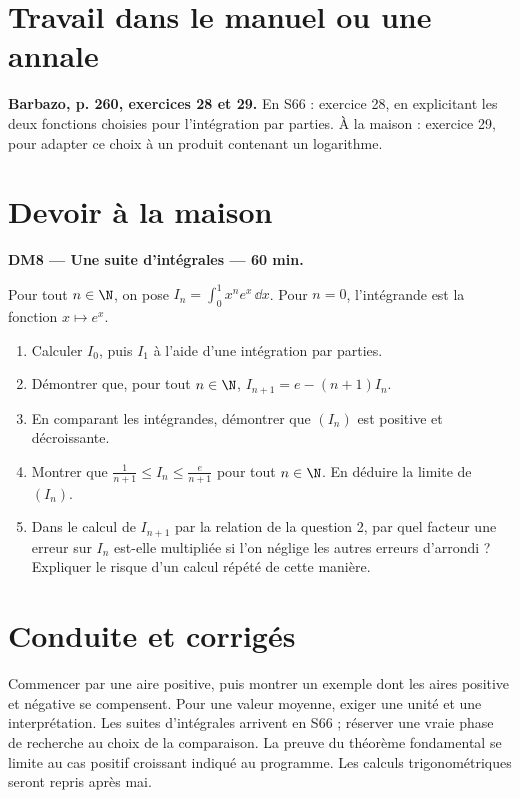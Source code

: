 \section{Travail dans le manuel ou une annale}\textbf{Barbazo, p. 260, exercices 28 et 29.} En S66 : exercice 28, en explicitant les deux fonctions choisies pour l'intégration par parties. À la maison : exercice 29, pour adapter ce choix à un produit contenant un logarithme.

\mxnewpage
\section{Devoir à la maison}\textbf{DM8 --- Une suite d'intégrales --- 60 min.}\par Pour tout $n\in\N$, on pose $I_n=\displaystyle\int_0^1x^ne^x\,\dd x$. Pour $n=0$, l'intégrande est la fonction $x\mapsto e^x$.
\begin{enumerate}\item Calculer $I_0$, puis $I_1$ à l'aide d'une intégration par parties.
\item Démontrer que, pour tout $n\in\N$, $I_{n+1}=e-(n+1)I_n$.
\item En comparant les intégrandes, démontrer que $(I_n)$ est positive et décroissante.
\item Montrer que $\frac1{n+1}\le I_n\le\frac e{n+1}$ pour tout $n\in\N$. En déduire la limite de $(I_n)$.
\item Dans le calcul de $I_{n+1}$ par la relation de la question 2, par quel facteur une erreur sur $I_n$ est-elle multipliée si l'on néglige les autres erreurs d'arrondi ? Expliquer le risque d'un calcul répété de cette manière.\end{enumerate}

\ifmxteacher\mxnewpage\section{Conduite et corrigés}\begin{teachernote}Commencer par une aire positive, puis montrer un exemple dont les aires positive et négative se compensent. Pour une valeur moyenne, exiger une unité et une interprétation. Les suites d'intégrales arrivent en S66 ; réserver une vraie phase de recherche au choix de la comparaison. La preuve du théorème fondamental se limite au cas positif croissant indiqué au programme. Les calculs trigonométriques seront repris après mai.\end{teachernote}

